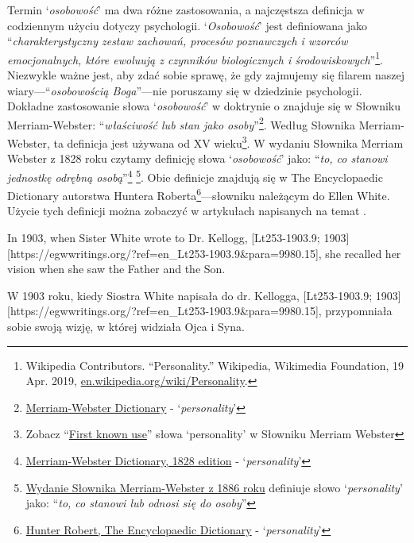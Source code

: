 Termin ‘\textit{osobowość}’ ma dwa różne zastosowania, a najczęstsza definicja w codziennym użyciu dotyczy psychologii. ‘\textit{Osobowość}’ jest definiowana jako “\textit{charakterystyczny zestaw zachowań, procesów poznawczych i wzorców emocjonalnych, które ewoluują z czynników biologicznych i środowiskowych}”\footnote{Wikipedia Contributors. “Personality.” Wikipedia, Wikimedia Foundation, 19 Apr. 2019, \href{https://en.wikipedia.org/wiki/Personality}{en.wikipedia.org/wiki/Personality}.}. Niezwykle ważne jest, aby zdać sobie sprawę, że gdy zajmujemy się filarem naszej wiary—“\textit{osobowością Boga}”—nie poruszamy się w dziedzinie psychologii. Dokładne zastosowanie słowa ‘\textit{osobowość}’ w doktrynie o  znajduje się w Słowniku Merriam-Webster: “\textit{właściwość lub stan jako osoby}”\footnote{\href{https://www.merriam-webster.com/dictionary/personality}{Merriam-Webster Dictionary} - ‘\textit{personality}’}. Według Słownika Merriam-Webster, ta definicja jest używana od XV wieku\footnote{Zobacz “\href{https://www.merriam-webster.com/dictionary/personality\#word-history}{First known use}” słowa ‘personality’ w Słowniku Merriam Webster}. W wydaniu Słownika Merriam Webster z 1828 roku czytamy definicję słowa ‘\textit{osobowość}’ jako: “\textit{to, co stanowi jednostkę odrębną osobą}”\footnote{\href{https://archive.org/details/americandictiona02websrich/page/272/mode/2up}{Merriam-Webster Dictionary, 1828 edition} - ‘\textit{personality}’} \footnote{\href{https://archive.org/details/websterscomplete00webs/page/974/mode/2up}{Wydanie Słownika Merriam-Webster z 1886 roku} definiuje słowo ‘\textit{personality}’ jako: “\textit{to, co stanowi lub odnosi się do osoby}”}. Obie definicje znajdują się w The Encyclopaedic Dictionary autorstwa Huntera Roberta\footnote{\href{https://babel.hathitrust.org/cgi/pt?id=mdp.39015050663213&view=1up&seq=780}{Hunter Robert, The Encyclopaedic Dictionary} - ‘\textit{personality}’}—słowniku należącym do Ellen White. Użycie tych definicji można zobaczyć w artykułach napisanych na temat .


In 1903, when Sister White wrote to Dr. Kellogg, [Lt253-1903.9; 1903][https://egwwritings.org/?ref=en\_Lt253-1903.9&para=9980.15], she recalled her vision when she saw the Father and the Son.


W 1903 roku, kiedy Siostra White napisała do dr. Kellogga, [Lt253-1903.9; 1903][https://egwwritings.org/?ref=en\_Lt253-1903.9&para=9980.15], przypomniała sobie swoją wizję, w której widziała Ojca i Syna.


